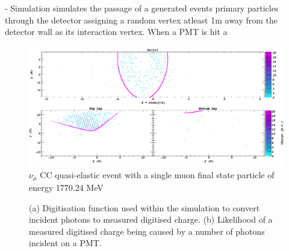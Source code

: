 - Simulation simulates the passage of a generated events primary particles through the detector
assigning a random vertex atleast 1m away from the detector wall as its interaction vertex. When a
PMT is hit a

\begin{figure} %
    \includegraphics[width=\textwidth]{diagrams/4-chips/sim_event.png}
    \caption[sim event short]
    {$\nu_{\mu}$ CC quasi-elastic event with a single muon final state particle of energy
        1770.24 MeV}
    \label{fig:sim_event}
\end{figure}

\begin{figure} %
    \centering
    \quad
    \caption[Simulation PMT digitisaion function.]
    {(a) Digitisation function used within the simulation to convert incident photons to measured
        digitised charge. (b) Likelihood of a measured digitised charge being caused by a number
        of photons incident on a PMT.}
    \label{fig:digitisation}
\end{figure}

